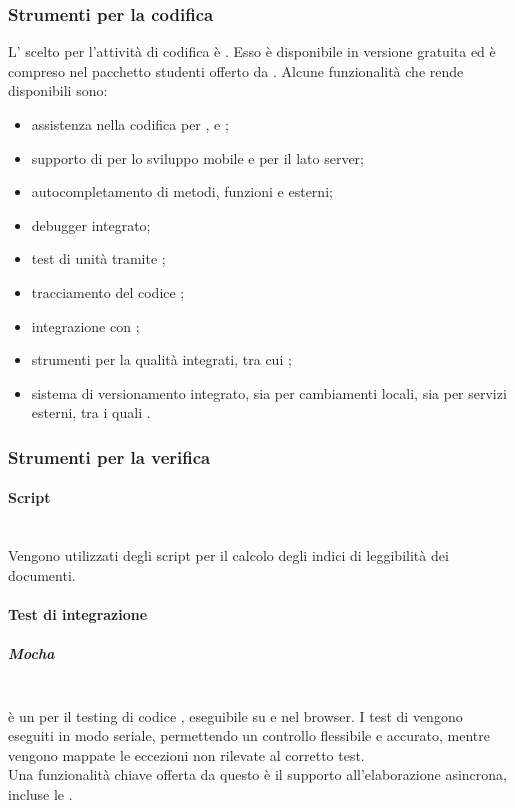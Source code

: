 \subsubsection{Strumenti per la codifica}
L' scelto per l'attività di codifica è \textbf{}. Esso è disponibile in versione gratuita ed è compreso nel pacchetto studenti offerto da . Alcune funzionalità che rende disponibili sono:
\begin{itemize}
	\item assistenza nella codifica per ,  e ;
	\item supporto di  per lo sviluppo mobile e  per il lato server;
	\item autocompletamento di metodi, funzioni e  esterni;
	\item debugger integrato;
	\item test di unità tramite ;
	\item tracciamento del codice ;
	\item integrazione con ;
	\item strumenti per la qualità integrati, tra cui ;
	\item sistema di versionamento integrato, sia per cambiamenti locali, sia per servizi esterni, tra i quali .
\end{itemize}

\subsubsection{Strumenti per la verifica}
\paragraph{Script}\mbox{}\\
Vengono utilizzati degli script per il calcolo degli indici di leggibilità dei documenti.

\paragraph{Test di integrazione}\mbox{}
\subparagraph{Mocha}\mbox{}\\
 è un  per il testing di codice , eseguibile su  e nel browser. I test di  vengono eseguiti in modo seriale, permettendo un controllo flessibile e accurato, mentre vengono mappate le eccezioni non rilevate al corretto test.\\
Una funzionalità chiave offerta da questo  è il supporto all’elaborazione asincrona, incluse le .

